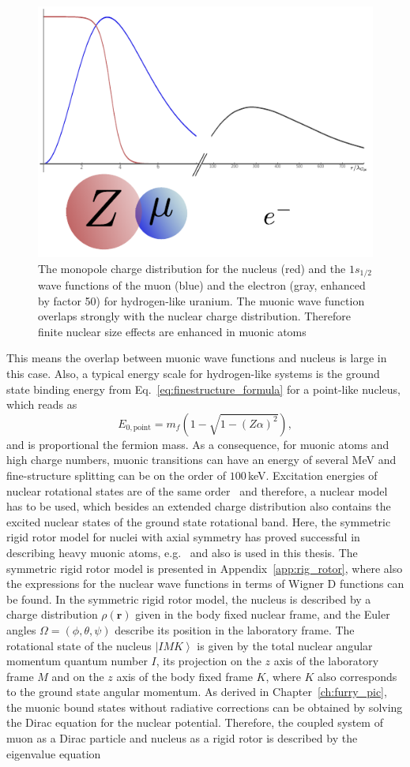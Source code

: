 %
\begin{figure}%
\centering
\includegraphics[width=0.75\linewidth]{pics/muon_groundState.pdf}%
\caption{The monopole charge distribution for the nucleus (red) and the $1s_{1/2}$ wave functions of the muon (blue) and the electron (gray, enhanced by factor 50) for hydrogen-like uranium. The muonic wave function overlaps strongly with the nuclear charge distribution. Therefore finite nuclear size effects are enhanced in muonic atoms}%
\label{fig:muonGS}%
\end{figure}
%
This means the overlap between muonic wave functions and nucleus is large in this case. Also, a typical energy scale for hydrogen-like systems is the ground state binding energy from Eq.~\eqref{eq:finestructure_formula} for a point-like nucleus, which reads as
\begin{equation}
E_{0,\text{point}}=m_f (1-\sqrt{1-(Z\alpha)^2}),
\end{equation}
and is proportional the fermion mass. As a consequence, for muonic atoms and high charge numbers, muonic transitions can have an energy of several MeV and fine-structure splitting can be on the order of $100\,$keV. Excitation energies of nuclear rotational states are of the same order~\cite{ENSDF} and therefore, a nuclear model has to be used, which besides an extended charge distribution also contains the excited nuclear states of the ground state rotational band. Here, the symmetric rigid rotor model for nuclei with axial symmetry has proved successful in describing heavy muonic atoms, e.g.~\cite{tanaka1984,hitlin1970,wu1969,Devons1995} and also is used in this thesis. The symmetric rigid rotor model is presented in Appendix~\ref{app:rig_rotor}, where also the expressions for the nuclear wave functions in terms of Wigner D functions can be found. In the symmetric rigid rotor model, the nucleus is described by a charge distribution $\rho(\mathbf{r})$ given in the body fixed nuclear frame, and the Euler angles $\Omega=(\phi,\theta,\psi)$ describe its position in the laboratory frame. The rotational state of the nucleus $\left|IMK\right>$ is given by the total nuclear angular momentum quantum number $I$, its projection on the $z$ axis of the laboratory frame $M$ and on the $z$ axis of the body fixed frame $K$, where $K$ also corresponds to the ground state angular momentum. As derived in Chapter~\ref{ch:furry_pic}, the muonic bound states without radiative corrections can be obtained by solving the Dirac equation for the nuclear potential. Therefore, the coupled system of muon as a Dirac particle and nucleus as a rigid rotor is described by the eigenvalue equation
